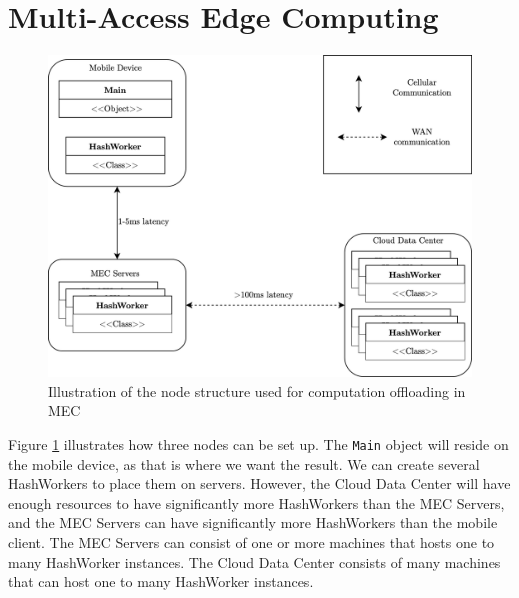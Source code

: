 
\section{Multi-Access Edge Computing}

\begin{figure}[t]
    \centering
    \includegraphics[scale=1]{chapters/5_implementation/figures/MEC_implementation.png}
    \caption{Illustration of the node structure used for computation offloading in MEC}
    \label{fig:MEC_implementation}
\end{figure}
Figure \ref{fig:MEC_implementation} illustrates how three nodes can be set up. The \verb|Main| object will reside on the mobile device, as that is where we want the result. We can create several HashWorkers to place them on servers. However, the Cloud Data Center will have enough resources to have significantly more HashWorkers than the MEC Servers, and the MEC Servers can have significantly more HashWorkers than the mobile client. The MEC Servers can consist of one or more machines that hosts one to many HashWorker instances. The Cloud Data Center consists of many machines that can host one to many HashWorker instances.





